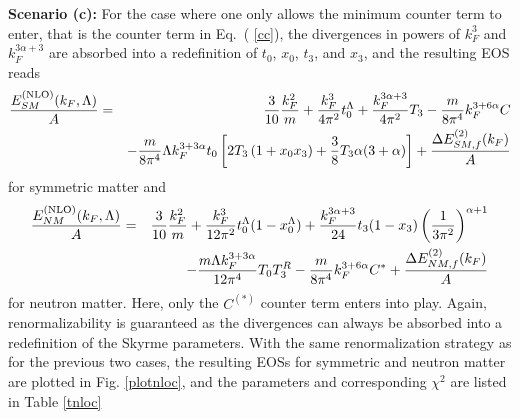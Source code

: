 \documentclass[aps,11pt,prc,preprint,superscriptaddress,nofootinbib]{revtex4}
\begin{document}
 {\bf Scenario (c):} 
For the case where one only allows the minimum counter term to enter, that is the counter term in Eq.~(%
\ref{cc}), the divergences in powers of $k_F^3$ and $k_F^{3\alpha+3}$ are
absorbed into a redefinition of $t_0$, $x_0$, $t_3$, and $x_3$, and the resulting
EOS reads%
\begin{eqnarray}
\frac{E_{SM}^{\rm (NLO)}(k_{F},\Lambda)}{A} &=&\frac{3}{10}\frac{k_{F}^{2}}{m}+\frac{%
k_{F}^{3}}{4\pi ^{2}}t_{0}^{\Lambda}+\frac{k_{F}^{3\alpha +3}}{4\pi ^{2}}T_{3}-%
\frac{m}{8\pi ^{4}}k_{F}^{3+6\alpha }C  \notag \\
&&-\frac{m}{8\pi ^{4}}\Lambda k_{F}^{3+3\alpha }t_{0}\left[ 2T_{3}\left(
1+x_{0}x_{3}\right) +\frac{3}{8}T_{3}\alpha (3+\alpha )\right]  + 
\frac{\Delta E_{SM,f}^{(2)}(k_{F})}{A}
  \label{a}
\end{eqnarray}
for symmetric matter and 
\begin{eqnarray}
\frac{E_{NM}^{\rm (NLO)}(k_{F},\Lambda)}{A} &=&\frac{3}{10}\frac{k_{F}^{2}}{m}+%
\frac{k_{F}^{3}}{12\pi ^{2}}t_{0}^{\Lambda}(1-x_{0}^{\Lambda})+\frac{k_{F}^{3\alpha +3}}{%
24}t_{3}(1-x_{3})\left( \frac{1}{3\pi ^{2}}\right) ^{\alpha +1}  \notag \\
&&-\frac{m\Lambda k_{F}^{3+3\alpha }}{12\pi ^{4}}T_{0}T_{3}^{R}-\frac{m}{%
8\pi ^{4}}k_{F}^{3+6\alpha }C^{\ast }+
\frac{\Delta E_{NM,f}^{(2)}(k_{F})}{A}
  \label{a2}
\end{eqnarray}%
for neutron matter. 
Here, only the $C^{(\ast )}$ counter term enters into play. Again, renormalizability is guaranteed as the divergences can always be absorbed into a redefinition of the Skyrme parameters. With the same renormalization strategy as for the previous two cases, the resulting EOSs for
symmetric and neutron matter are plotted in Fig. \ref{plotnloc}, and the
parameters and corresponding $\chi ^{2}$ are listed in Table \ref{tnloc}%
\end{document}
